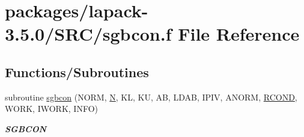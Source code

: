 \hypertarget{sgbcon_8f}{}\section{packages/lapack-\/3.5.0/\+S\+R\+C/sgbcon.f File Reference}
\label{sgbcon_8f}
\subsection*{Functions/\+Subroutines}
\begin{DoxyCompactItemize}
\item 
subroutine \hyperlink{group__realGBcomputational_gab69fe5a37c3f7361c009bce69f8baf3d}{sgbcon} (N\+O\+R\+M, \hyperlink{polmisc_8c_a0240ac851181b84ac374872dc5434ee4}{N}, K\+L, K\+U, A\+B, L\+D\+A\+B, I\+P\+I\+V, A\+N\+O\+R\+M, \hyperlink{superlu__enum__consts_8h_af00a42ecad444bbda75cde1b64bd7e72a9b5c151728d8512307565994c89919d5}{R\+C\+O\+N\+D}, W\+O\+R\+K, I\+W\+O\+R\+K, I\+N\+F\+O)
\begin{DoxyCompactList}\small\item\em {\bfseries S\+G\+B\+C\+O\+N} \end{DoxyCompactList}\end{DoxyCompactItemize}
